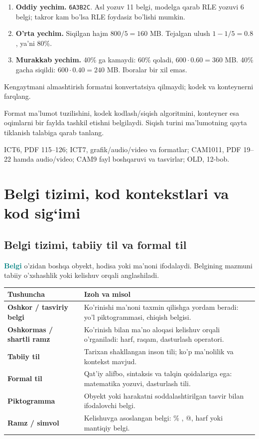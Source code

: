 \documentclass[11pt,a4paper,oneside]{book}
\newcommand{\term}[1]{\textbf{\textcolor{Teal}{#1}}\index{#1}}
\begin{document}
\begin{solutionbox}
\begin{enumerate}[leftmargin=7mm]
\item \textbf{Oddiy yechim.} \texttt{6A3B2C}. Asl yozuv 11 belgi, modelga qarab RLE yozuvi 6 belgi; takror kam bo'lsa RLE foydasiz bo'lishi mumkin.
\item \textbf{O'rta yechim.} Siqilgan hajm $800/5=160$ MB. Tejalgan ulush $1-1/5=0.8$, ya'ni 80\%.
\item \textbf{Murakkab yechim.} 40\% ga kamaydi: 60\% qoladi, $600\cdot0.60=360$ MB. 40\% gacha siqildi: $600\cdot0.40=240$ MB. Iboralar bir xil emas.
\end{enumerate}
\end{solutionbox}
\begin{attest}Kengaytmani almashtirish formatni konvertatsiya qilmaydi; kodek va konteynerni farqlang.\end{attest}

\begin{summarybox}
Format ma'lumot tuzilishini, kodek kodlash/siqish algoritmini, konteyner esa oqimlarni bir faylda tashkil etishni belgilaydi. Siqish turini ma'lumotning qayta tiklanish talabiga qarab tanlang.
\end{summarybox}
\begin{sourcebox}
ICT6, PDF 115--126; ICT7, grafik/audio/video va formatlar; CAM1011, PDF 19--22 hamda audio/video; CAM9 fayl boshqaruvi va tasvirlar; OLD, 12-bob.
\end{sourcebox}
\section{Belgi tizimi, kod kontekstlari va kod sig‘imi}
\subsection{Belgi tizimi, tabiiy til va formal til}
\term{Belgi} o'zidan boshqa obyekt, hodisa yoki ma'noni ifodalaydi. Belgining mazmuni tabiiy o'xshashlik yoki kelishuv orqali anglashiladi.

\begin{tabularx}{\textwidth}{>{\sffamily\bfseries}p{}X}
\toprule
Tushuncha & Izoh va misol\\
\midrule
Oshkor / tasviriy belgi & Ko'rinishi ma'noni taxmin qilishga yordam beradi: yo'l piktogrammasi, chiqish belgisi.\\
Oshkormas / shartli ramz & Ko'rinish bilan ma'no aloqasi kelishuv orqali o'rganiladi: harf, raqam, dasturlash operatori.\\
Tabiiy til & Tarixan shakllangan inson tili; ko'p ma'nolilik va kontekst mavjud.\\
Formal til & Qat'iy alifbo, sintaksis va talqin qoidalariga ega: matematika yozuvi, dasturlash tili.\\
Piktogramma & Obyekt yoki harakatni soddalashtirilgan tasvir bilan ifodalovchi belgi.\\
Ramz / simvol & Kelishuvga asoslangan belgi: \% , @, harf yoki mantiqiy belgi.\\
\bottomrule
\end{tabularx}
\end{document}
